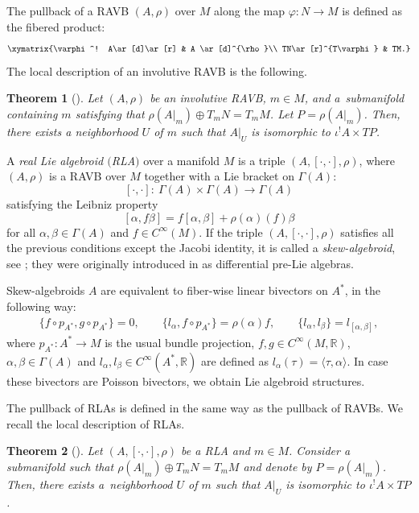 \documentclass[pdftex]{sigma}
\numberwithin{equation}{section}
\newtheorem{Theorem}{Theorem}[section]
\newcommand{\R}{{\mathbb{R}}}
\newcommand{\ra}{\rangle}
\begin{document}
The pullback of a RAVB $(A, \rho) $ over $M$ along the map $\varphi\colon N\to M$ is defined as the fibered product:
\[
\xymatrix{\varphi^! A\ar[d]\ar[r] & A \ar[d]^{\rho}\\
TN\ar[r]^{T\varphi} & TM.}
\]
The local description of an involutive RAVB is the following.
\begin{Theorem}[{\cite[Corollary 3.14]{bursztyn2019splitting}}]\label{splitting_ravb}
Let $(A,\rho)$ be an involutive RAVB, $m\in M$, and  a~submanifold containing $m$ satisfying that $\rho(A|_m)\oplus T_m N=T_m M$. Let $P=\rho(A|_m)$. Then, there exists a neighborhood $U$ of $m$ such that $A|_{U}$ is isomorphic to $\iota^! A\times TP$.
\end{Theorem}
\begin{Definition}A {\em real Lie algebroid $($RLA$)$} over a manifold $M$ is a triple $(A, [\cdot, \cdot], \rho)$, where $(A,\rho)$ is a RAVB over $M$ together with a Lie bracket on $\Gamma(A)$:
\[[\cdot,\cdot]\colon\ \Gamma(A)\times \Gamma(A)\to\Gamma(A)\]
satisfying the Leibniz property
\[[\alpha,f\beta]=f[\alpha,\beta]+\rho(\alpha)(f)\beta\]
 for all $\alpha,\beta\in \Gamma(A)$ and $f\in C^{\infty}(M)$. If the triple $(A,[\cdot,\cdot],\rho)$ satisfies all the previous conditions except the Jacobi identity, it is called a {\em skew-algebroid}, see \cite[Definition 4.1]{grabowski2022nonassociative}; they were originally introduced in \cite{kosmann1990poisson} as differential pre-Lie algebras.
\end{Definition}

Skew-algebroids $A$ are equivalent to fiber-wise linear bivectors on $A^*$, in the following way:
\begin{align*}
\{f\circ p_{A^*},g\circ p_{A^*}\}=0,\qquad
\{l_{\alpha}, f\circ p_{A^*}\}=\rho(\alpha)f,\qquad
\{l_{\alpha},l_{\beta}\}=l_{[\alpha,\beta]},
\end{align*}
where $p_{A^*}\colon A^* \to M$ is the usual bundle projection, $f, g\in C^{\infty}(M,\R)$, $\alpha,\beta\in \Gamma(A)$ and ${l_{\alpha}, l_{\beta}\in C^{\infty}(A^*,\R)}$ are defined as $l_{\alpha}(\tau)=\langle\tau,\alpha\ra$. In case these bivectors are Poisson bivectors, we obtain Lie algebroid structures.

The pullback of RLAs is defined in the same way as the pullback of RAVBs. We recall the local description of RLAs.

\begin{Theorem}[{\cite{bursztyn2019splitting, fernandes2002lie, Dufour2001NormalFF}}]
 Let $(A,[\cdot,\cdot],\rho)$ be a RLA and $m\in M$. Consider a submanifold  such that $\rho(A|_{m})\oplus T_m N=T_m M$ and denote by $P=\rho(A|_{m})$. Then, there exists a~neighborhood $U$ of $m$ such that $A|_{U}$ is isomorphic to $\iota^! A\times TP$.
\end{Theorem}
\end{document}
